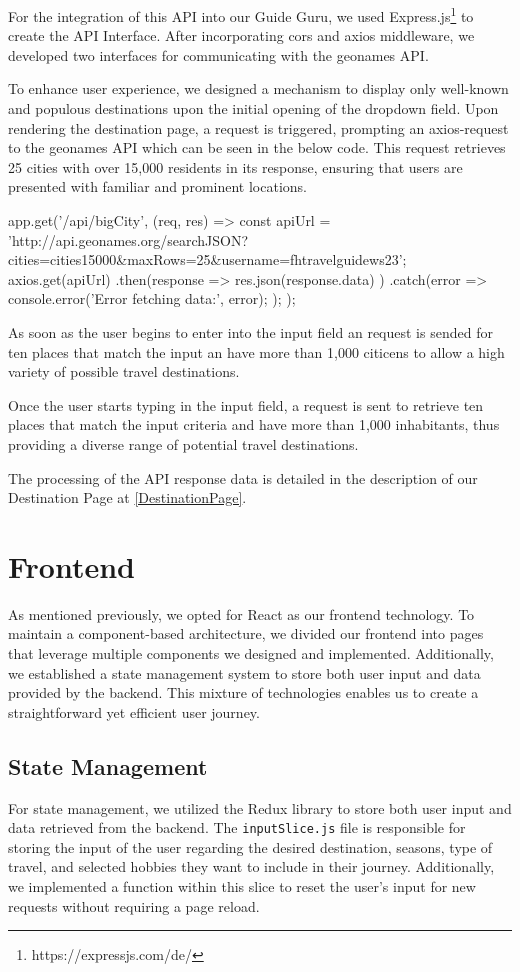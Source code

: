 \documentclass[english,notitlepage,smartquotes]{hgbreport}
\begin{document}
For the integration of this API into our Guide Guru, we used Express.js\footnote{https://expressjs.com/de/} to create the API Interface. After incorporating cors and axios middleware, we developed two interfaces for communicating with the geonames API.

To enhance user experience, we designed a mechanism to display only well-known and populous destinations upon the initial opening of the dropdown field. Upon rendering the destination page, a request is triggered, prompting an axios-request to the geonames API which can be seen in the below code. This request retrieves 25 cities with over 15,000 residents in its response, ensuring that users are presented with familiar and prominent locations.

\begin{JsCode}
app.get('/api/bigCity', (req, res) => {
	const apiUrl = 'http://api.geonames.org/searchJSON?cities=cities15000&maxRows=25&username=fhtravelguidews23';
	axios.get(apiUrl)
	.then(response => {
		res.json(response.data)
	})
	.catch(error => {
		console.error('Error fetching data:', error);
	});
});
\end{JsCode}

As soon as the user begins to enter into the input field an request is sended for ten places that match the input an have more than 1,000 citicens to allow a high variety of possible travel destinations. 

Once the user starts typing in the input field, a request is sent to retrieve ten places that match the input criteria and have more than 1,000 inhabitants, thus providing a diverse range of potential travel destinations.

The processing of the API response data is detailed in the description of our Destination Page at \ref{DestinationPage}.

\section{Frontend}

As mentioned previously, we opted for React as our frontend technology. To maintain a component-based architecture, we divided our frontend into pages that leverage multiple components we designed and implemented. Additionally, we established a state management system to store both user input and data provided by the backend. This mixture of technologies enables us to create a straightforward yet efficient user journey.

\subsection{State Management}
For state management, we utilized the Redux library to store both user input and data retrieved from the backend. The  \texttt{inputSlice.js} file is responsible for storing the input of the user regarding the desired destination, seasons, type of travel, and selected hobbies they want to include in their journey. Additionally, we implemented a function within this slice to reset the user's input for new requests without requiring a page reload.
\end{document}
